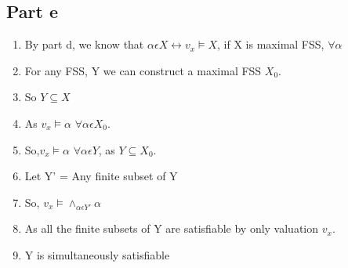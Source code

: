 \documentclass[12pt]{scrartcl}
\begin{document}
\subsection{Part e}
\begin{enumerate}
    \item By part d, we know that $\alpha \epsilon X \leftrightarrow v_{x} \models X$, if X is maximal FSS, $\forall \alpha$
    \item For any FSS, Y we can construct a maximal FSS $X_0$.
    \item So $Y \subseteq X$
    \item As $v_{x} \models \alpha$ $\forall \alpha \epsilon X_{0}$.
    \item So,$v_{x} \models \alpha$ $\forall \alpha \epsilon Y$, as $Y \subseteq X_{0}$.
    \item Let Y' = Any finite subset of Y
    \item So, $v_{x} \models \wedge_{\alpha \epsilon Y'}\alpha$
    \item As all the finite subsets of Y are satisfiable by only valuation $v_{x}$.
    \item Y is simultaneously satisfiable
\end{enumerate}
\end{document}
